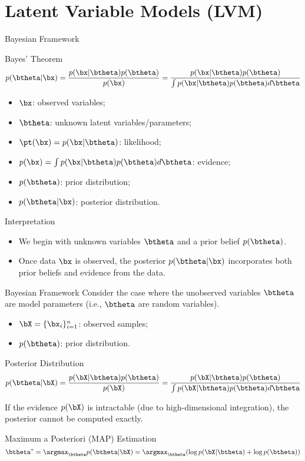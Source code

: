 \documentclass{beamer}
\begin{document}
\section{Latent Variable Models (LVM)}
\begin{frame}{Bayesian Framework}
	\begin{block}{Bayes' Theorem}
		\vspace{-0.3cm}
		\[
			p(\btheta| \bx) = \frac{p(\bx | \btheta) p(\btheta)}{p(\bx)} = \frac{p(\bx | \btheta) p(\btheta)}{\int p(\bx | \btheta) p(\btheta) d \btheta} 
		\]
		\vspace{-0.3cm}
		\begin{itemize}
			\item $\bx$: observed variables; 
			\item $\btheta$: unknown latent variables/parameters;
			\item $\pt(\bx) = p(\bx | \btheta)$: likelihood;
			\item $p(\bx) = \int p(\bx | \btheta) p(\btheta) d\btheta$: evidence;
			\item $p(\btheta)$: prior distribution;
			\item $p(\btheta| \bx)$: posterior distribution.
		\end{itemize}
	\end{block}
    \eqpause
	\begin{block}{Interpretation}
		\begin{itemize}
			\item We begin with unknown variables $\btheta$ and a prior belief $p(\btheta)$.
			\item Once data $\bx$ is observed, the posterior $p(\btheta| \bx)$ incorporates both prior beliefs and evidence from the data.
		\end{itemize} 
	\end{block}
\end{frame}
\begin{frame}{Bayesian Framework}
	Consider the case where the unobserved variables $\btheta$ are model parameters (i.e., $\btheta$ are random variables).
	\begin{itemize}
		\item $\bX = \{\bx_i\}_{i=1}^n$: observed samples;
		\item $p(\btheta)$: prior distribution.
	\end{itemize}
    \eqpause
	\begin{block}{Posterior Distribution}
		\[
			p(\btheta | \bX) = \frac{p(\bX | \btheta) p(\btheta)}{p(\bX)} = \frac{p(\bX | \btheta) p(\btheta)}{\int p(\bX | \btheta) p(\btheta) d \btheta} 
		\]
		\vspace{-0.2cm}
	\end{block}
    \eqpause
	If the evidence $p(\bX)$ is intractable (due to high-dimensional integration), the posterior cannot be computed exactly.
    \eqpause
    \begin{block}{Maximum a Posteriori (MAP) Estimation}
	    \vspace{-0.2cm}
	    \[
	        \btheta^* = \argmax_{\btheta} p(\btheta | \bX) = \argmax_{\btheta} (\log p(\bX | \btheta) + \log p(\btheta))
	    \]
    \end{block}
\end{frame}
\end{document}

